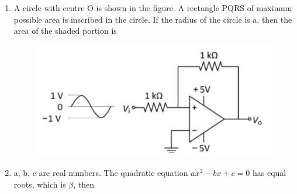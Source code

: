 \documentclass[a4paper, 11pt]{article}
\begin{document}
\begin{enumerate}
    \item A circle with centre O is shown in the figure. A rectangle PQRS of maximum possible area is inscribed in the circle. If the radius of the circle is a, then the area of the shaded portion is
    \begin{figure}[H]
        \centering
        \includegraphics[width=0.3\columnwidth]{figs/Q8.png}
        \caption*{}
        \label{fig:q8}
    \end{figure}
    \begin{enumerate}
    \end{enumerate}

    \hfill{}

    \item a, b, c are real numbers. The quadratic equation $ax^2 - bx + c = 0$ has equal roots, which is $\beta$, then
    \begin{enumerate}
    \end{enumerate}

    \hfill{}


\end{enumerate}
\end{document}
